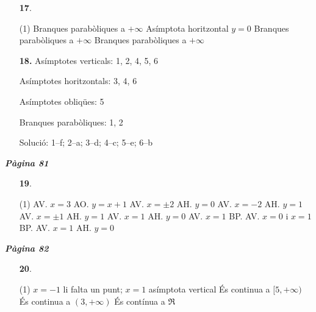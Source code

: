 \documentclass[a4paper, pdf, twoside]{book}
\begin{document}
\begin{multicols}{2}
\begin{enumerate}
 \item[\fontfamily{phv}\selectfont\color{blue}\textbf{17}. ] 
 \begin{tasks}[column-sep=1em, item-indent=1.3333em](1)
	 \task* Branques parabòliques a $+\infty $
	 \task Asímptota horitzontal $y=0$
	 \task* Branques parabòliques a $+\infty $
	 \task* Branques parabòliques a $+\infty $
\end{tasks}
\vspace{0.25cm}
\item[\fontfamily{phv}\selectfont\color{blue}\textbf{18. }] 
Asímptotes verticals: 1, 2, 4, 5, 6 \par Asímptotes horitzontals: 3, 4, 6 \par Asímptotes obliqües: 5 \par Branques parabòliques: 1, 2 \par Solució: 1--f; 2--a; 3--d; 4--c; 5--e; 6--b
 \end{enumerate}
\vspace{0.3cm}


{\textbf{\em Pàgina 81}} \hrulefill
\begin{enumerate}
\vspace{0.25cm}



 \item[\fontfamily{phv}\selectfont\color{blue}\textbf{19}. ]  \scalebox{0.6}{\simbolclau } 
 \begin{tasks}[column-sep=1em, item-indent=1.3333em](1)
	 \task AV. $x=3$ AO. $y=x+1$
	 \task AV. $x=\pm 2$ AH. $y=0$
	 \task AV. $x=- 2$ AH. $y=1$
	 \task AV. $x=\pm 1$ AH. $y=1$
	 \task AV. $x=1$ AH. $y=0$
	 \task AV. $x=1$ BP.
	 \task AV. $x=0$ i $x=1$ BP.
	 \task AV. $x=1$ AH. $y=0$
\end{tasks}
 \end{enumerate}
\vspace{0.3cm}


{\textbf{\em Pàgina 82}} \hrulefill
\begin{enumerate}
\vspace{0.25cm}



 \item[\fontfamily{phv}\selectfont\color{blue}\textbf{20}. ] 
 \begin{tasks}[column-sep=1em, item-indent=1.3333em](1)
	 \task* $x=-1$ li falta un punt; $x=1$ asímptota vertical
	 \task És continua a $[5,+\infty )$
	 \task És continua a $(3,+\infty )$
	 \task És contínua a $\Re $
\end{tasks}
 \end{enumerate}
\begin{enumerate}
\vspace{0.25cm}



\end{enumerate}
\end{multicols}
\end{document}
